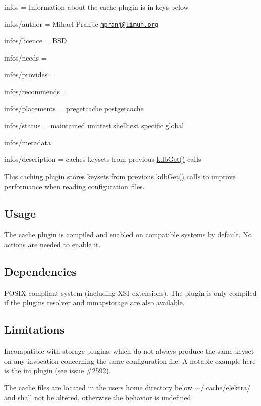 
\begin{DoxyItemize}
\item infos = Information about the cache plugin is in keys below
\item infos/author = Mihael Pranjic \href{mailto:mpranj@limun.org}{\tt mpranj@limun.\+org}
\item infos/licence = B\+SD
\item infos/needs =
\item infos/provides =
\item infos/recommends =
\item infos/placements = pregetcache postgetcache
\item infos/status = maintained unittest shelltest specific global
\item infos/metadata =
\item infos/description = caches keysets from previous {\ttfamily \hyperlink{group__kdb_ga28e385fd9cb7ccfe0b2f1ed2f62453a1}{kdb\+Get()}} calls
\end{DoxyItemize}

This caching plugin stores keysets from previous {\ttfamily \hyperlink{group__kdb_ga28e385fd9cb7ccfe0b2f1ed2f62453a1}{kdb\+Get()}} calls to improve performance when reading configuration files.

\subsection*{Usage}

The cache plugin is compiled and enabled on compatible systems by default. No actions are needed to enable it.

\subsection*{Dependencies}

P\+O\+S\+IX compliant system (including X\+SI extensions). The plugin is only compiled if the plugins {\ttfamily resolver} and {\ttfamily mmapstorage} are also available.

\subsection*{Limitations}

Incompatible with storage plugins, which do not always produce the same keyset on any invocation concerning the same configuration file. A notable example here is the {\ttfamily ini} plugin (see issue \#2592).

The cache files are located in the user\textquotesingle{}s home directory below {\ttfamily $\sim$/.cache/elektra/} and shall not be altered, otherwise the behavior is undefined. 